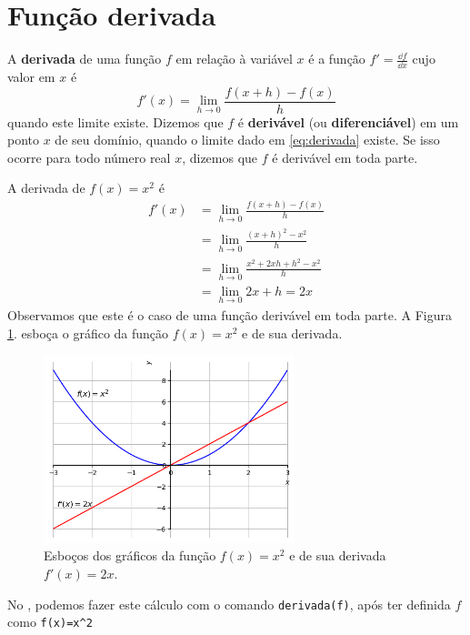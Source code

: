 \cleardoublepage\documentclass[../main.tex]{subfiles}
\begin{document}
\section{Função derivada}\label{cap_deriv_sec_funder}
\begin{framed}
\begin{definition}
A {\bf derivada} de uma função $f$ em relação à variável $x$ é a função $\displaystyle f' = \frac{\dd f}{\dd x}$ cujo valor em $x$ é
\begin{equation}\label{eq:derivada}
  f'(x) = \lim_{h\to 0} \frac{f(x+h)-f(x)}{h}
\end{equation}
quando este limite existe. Dizemos que $f$ é {\bf derivável} (ou {\bf diferenciável}) em um ponto $x$ de seu domínio, quando o limite dado em \ref{eq:derivada} existe. Se isso ocorre para todo número real $x$, dizemos que $f$ é derivável em toda parte.
\end{definition}
\end{framed}

\begin{ex}
  A derivada de $f(x) = x^2$ é
  \begin{align*}
    f'(x) &= \lim_{h\to 0} \frac{f(x+h)-f(x)}{h}\\
          &= \lim_{h\to 0} \frac{(x+h)^2 - x^2}{h}\\
          &= \lim_{h\to 0} \frac{x^2+2xh+h^2-x^2}{h}\\
          &= \lim_{h\to 0} 2x+h = 2x
  \end{align*}
  Observamos que este é o caso de uma função derivável em toda parte. A Figura \ref{fig:deriv_ex_ffl_x2}. esboça o gráfico da função $f(x)=x^2$ e de sua derivada.

  \begin{figure}[H]
    \centering
    \includegraphics[width=0.65\textwidth]{fig_deriv/fig_deriv_ex_ffl_x2}
    \caption{Esboços dos gráficos da função $f(x)=x^2$ e de sua derivada $f'(x) = 2x$.}
    \label{fig:deriv_ex_ffl_x2}
  \end{figure}  
  No \geogebra, podemos fazer este cálculo com o comando \verb+derivada(f)+, após ter definida $f$ como \verb+f(x)=x^2+
 \end{ex}
\end{document}
